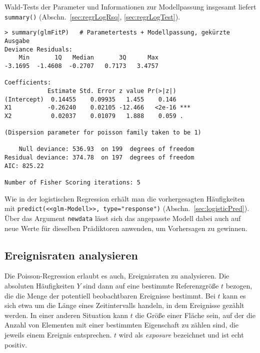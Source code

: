 Wald-Tests der Parameter und Informationen zur Modellpassung insgesamt liefert \lstinline!summary()! (Abschn.\ \ref{sec:regrLogRsq}, \ref{sec:regrLogTest}).
\begin{lstlisting}
> summary(glmFitP)   # Parametertests + Modellpassung, gekürzte Ausgabe
Deviance Residuals:
    Min       1Q   Median       3Q      Max
-3.1695  -1.4608  -0.2707   0.7173   3.4757

Coefficients:
            Estimate Std. Error z value Pr(>|z|)
(Intercept)  0.14455    0.09935   1.455    0.146
X1          -0.26240    0.02105 -12.466   <2e-16 ***
X2           0.02037    0.01079   1.888    0.059 .

(Dispersion parameter for poisson family taken to be 1)

    Null deviance: 536.93  on 199  degrees of freedom
Residual deviance: 374.78  on 197  degrees of freedom
AIC: 825.22

Number of Fisher Scoring iterations: 5
\end{lstlisting}

Wie in der logistischen Regression erhält man die vorhergesagten Häufigkeiten mit \lstinline!predict(<<glm-Modell>>, type="response")! (Abschn.\ \ref{sec:logisticPred}). Über das Argument \lstinline!newdata! lässt sich das angepasste Modell dabei auch auf neue Werte für dieselben Prädiktoren anwenden, um Vorhersagen zu gewinnen.

\subsection{Ereignisraten analysieren}
\label{sec:poissonRate}

Die Poisson-Regression erlaubt es auch, Ereignisraten zu analysieren. Die absoluten Häufigkeiten $Y$ sind dann auf eine bestimmte Referenzgröße $t$ bezogen, die die Menge der potentiell beobachtbaren Ereignisse bestimmt. Bei $t$ kann es sich etwa um die Länge eines Zeitintervalls handeln, in dem Ereignisse gezählt werden. In einer anderen Situation kann $t$ die Größe einer Fläche sein, auf der die Anzahl von Elementen mit einer bestimmten Eigenschaft zu zählen sind, die jeweils einem Ereignis entsprechen. $t$ wird als \emph{exposure} bezeichnet und ist echt positiv.

